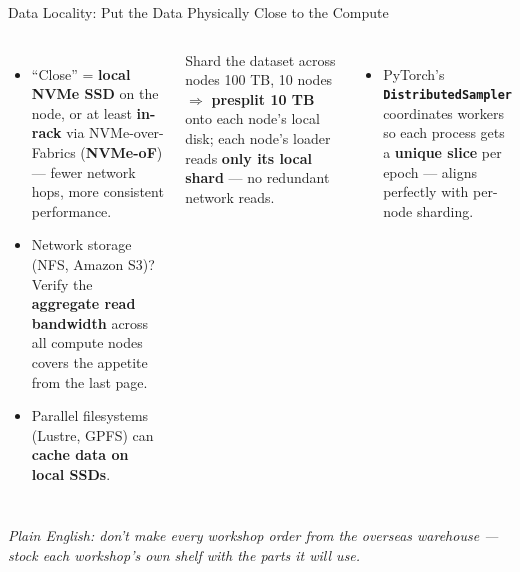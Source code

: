 \documentclass[aspectratio=169]{beamer}
\newcommand{\kw}[1]{\textbf{\textcolor{kwblue}{#1}}}
\newcommand{\pe}[1]{\par{\setlength{\fboxsep}{2.5pt}\noindent\colorbox{navy!9}{\parbox{\dimexpr\textwidth-5pt\relax}{\footnotesize\itshape Plain English: #1}}}}
\begin{document}
\begin{frame}{Data Locality: Put the Data Physically Close to the Compute}
  \begin{columns}[t]
    \begin{itemize}\small
      \item ``Close'' = \kw{local NVMe SSD} on the node, or at least \kw{in-rack} via
            NVMe-over-Fabrics (\kw{NVMe-oF}) --- fewer network hops, more consistent performance.
      \item Network storage (NFS, Amazon S3)? Verify the \kw{aggregate read bandwidth}
            across all compute nodes covers the appetite from the last page.
      \item Parallel filesystems (Lustre, GPFS) can \kw{cache data on local SSDs}.
    \end{itemize}
    \begin{block}{Shard the dataset across nodes}
      \small 100 TB, 10 nodes $\Rightarrow$ \kw{presplit 10 TB} onto each node's local disk;
      each node's loader reads \kw{only its local shard} --- no redundant network reads.
    \end{block}
    \begin{itemize}\small
      \item PyTorch's \kw{\texttt{DistributedSampler}} coordinates workers so each process
            gets a \kw{unique slice} per epoch --- aligns perfectly with per-node sharding.
    \end{itemize}
  \end{columns}
  \pe{don't make every workshop order from the overseas warehouse --- stock each workshop's own shelf with the parts it will use.}
\end{frame}
\end{document}
